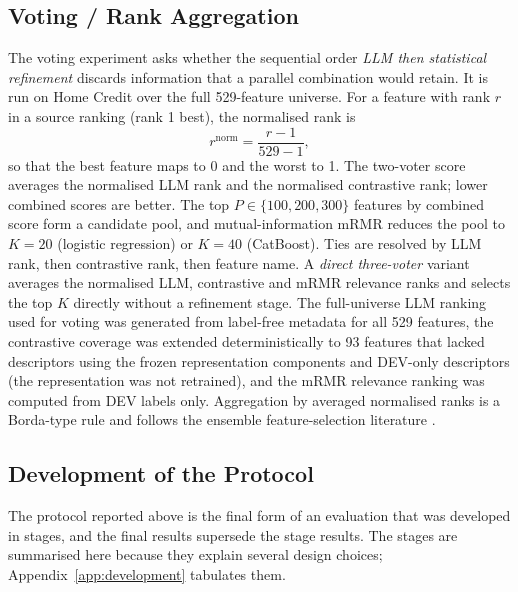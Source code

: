 \documentclass[preprint,12pt]{elsarticle}
\newcommand{\Kfeat}{K}
\begin{document}
\subsection{Voting / Rank Aggregation}
\label{subsec:voting_fs}

The voting experiment asks whether the sequential order \emph{LLM then statistical refinement} discards information that a parallel combination would retain. It is run on Home Credit over the full 529-feature universe. For a feature with rank $r$ in a source ranking (rank 1 best), the normalised rank is
\begin{equation}
    r^{\mathrm{norm}}=\frac{r-1}{529-1},
    \label{eq:normrank}
\end{equation}
so that the best feature maps to 0 and the worst to 1. The two-voter score averages the normalised LLM rank and the normalised contrastive rank; lower combined scores are better. The top $P\in\{100,200,300\}$ features by combined score form a candidate pool, and mutual-information mRMR reduces the pool to $\Kfeat=20$ (logistic regression) or $\Kfeat=40$ (CatBoost). Ties are resolved by LLM rank, then contrastive rank, then feature name. A \emph{direct three-voter} variant averages the normalised LLM, contrastive and mRMR relevance ranks and selects the top $\Kfeat$ directly without a refinement stage. The full-universe LLM ranking used for voting was generated from label-free metadata for all 529 features, the contrastive coverage was extended deterministically to 93 features that lacked descriptors using the frozen representation components and DEV-only descriptors (the representation was not retrained), and the mRMR relevance ranking was computed from DEV labels only. Aggregation by averaged normalised ranks is a Borda-type rule \cite{dwork2001} and follows the ensemble feature-selection literature \cite{saeys2008,boloncanedo2019}.

\subsection{Development of the Protocol}
\label{subsec:protocol_development}

The protocol reported above is the final form of an evaluation that was developed in stages, and the final results supersede the stage results. The stages are summarised here because they explain several design choices; Appendix~\ref{app:development} tabulates them.
\end{document}
